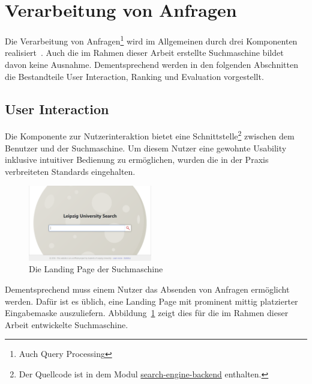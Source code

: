 \section{Verarbeitung von Anfragen}
\label{chap:query_processing}

Die Verarbeitung von Anfragen\footnote{Auch Query Processing} wird im Allgemeinen durch drei Komponenten realisiert~\cite{croft.chap2}.
Auch die im Rahmen dieser Arbeit erstellte Suchmaschine bildet davon keine Ausnahme.
Dementsprechend werden in den folgenden Abschnitten die Bestandteile User Interaction, Ranking und Evaluation vorgestellt.

\subsection{User Interaction~\cite{croft.chap2}}
\label{chap:user_interaction}

Die Komponente zur Nutzerinteraktion bietet eine Schnittstelle\footnote{Der Quellcode ist in dem Modul
\href{https://github.com/mam10eks/search-homepage-of-university-leipzig/tree/master/search-engine-backend}{search-engine-backend}
enthalten.}
zwischen dem Benutzer und der Suchmaschine.
Um diesem Nutzer eine gewohnte Usability inklusive intuitiver Bedienung zu ermöglichen,
wurden die in der Praxis verbreiteten Standards eingehalten.

\begin{figure}
	\vspace*{-0.4cm}
	\includegraphics[width=0.48\textwidth]{chapter_query_processing/frontend_landing_page.png}
	\caption{Die Landing Page der Suchmaschine}
	\label{fig:landing_page}
	\vspace*{-0.2cm}
\end{figure}


Dementsprechend muss einem Nutzer das Absenden von Anfragen ermöglicht werden.
Dafür ist es üblich, eine Landing Page mit prominent mittig platzierter Eingabemaske auszuliefern\cite{baeza_yates.search_interfaces}.
Abbildung~\ref{fig:landing_page} zeigt dies für die im Rahmen dieser Arbeit entwickelte Suchmaschine.

